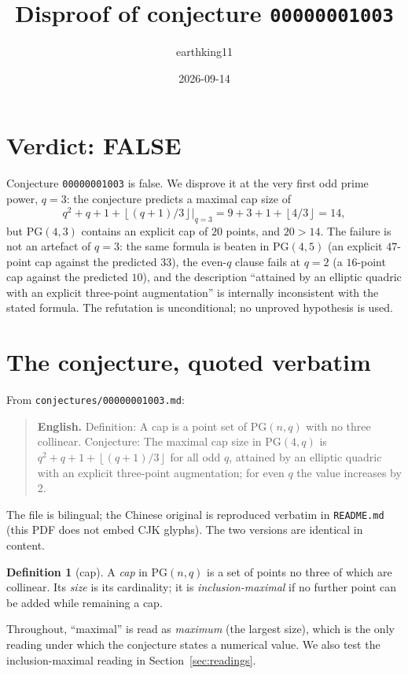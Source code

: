 \documentclass[11pt]{article}
\title{Disproof of conjecture \texttt{00000001003}}
\author{earthking11}
\date{2026-09-14}
\theoremstyle{definition}
\newtheorem{definition}[theorem]{Definition}
\theoremstyle{remark}
\newcommand{\PG}{\mathrm{PG}}
\newcommand{\floor}[1]{\left\lfloor #1 \right\rfloor}
\begin{document}
\maketitle

\section*{Verdict: FALSE}

Conjecture \texttt{00000001003} is false. We disprove it at the very first odd
prime power, $q=3$: the conjecture predicts a maximal cap size of
\[
q^{2}+q+1+\floor{(q+1)/3}\Big|_{q=3}=9+3+1+\floor{4/3}=14,
\]
but $\PG(4,3)$ contains an explicit cap of $20$ points, and $20>14$. The failure
is not an artefact of $q=3$: the same formula is beaten in $\PG(4,5)$ (an
explicit $47$-point cap against the predicted $33$), the even-$q$ clause fails
at $q=2$ (a $16$-point cap against the predicted $10$), and the description
``attained by an elliptic quadric with an explicit three-point augmentation'' is
internally inconsistent with the stated formula. The refutation is
unconditional; no unproved hypothesis is used.

\section{The conjecture, quoted verbatim}

From \texttt{conjectures/00000001003.md}:

\begin{quote}
\textbf{English.} Definition: A cap is a point set of $\PG(n,q)$ with no three
collinear. Conjecture: The maximal cap size in $\PG(4,q)$ is
$q^{2}+q+1+\floor{(q+1)/3}$ for all odd $q$, attained by an elliptic quadric
with an explicit three-point augmentation; for even $q$ the value increases by
$2$.
\end{quote}

The file is bilingual; the Chinese original is reproduced verbatim in
\texttt{README.md} (this PDF does not embed CJK glyphs). The two versions are
identical in content.

\begin{definition}[cap]
A \emph{cap} in $\PG(n,q)$ is a set of points no three of which are collinear.
Its \emph{size} is its cardinality; it is \emph{inclusion-maximal} if no further
point can be added while remaining a cap.
\end{definition}

Throughout, ``maximal'' is read as \emph{maximum} (the largest size), which is
the only reading under which the conjecture states a numerical value. We also
test the inclusion-maximal reading in Section~\ref{sec:readings}.
\end{document}
